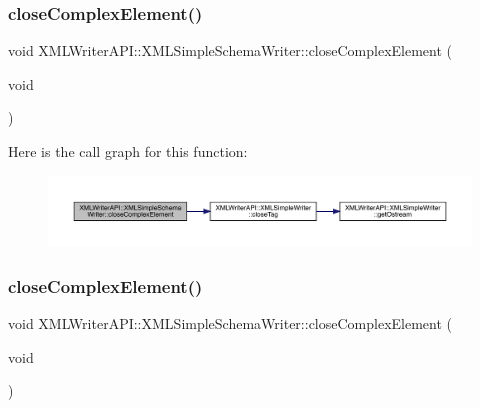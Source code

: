 \subsubsection{\texorpdfstring{closeComplexElement()}{closeComplexElement()}\hspace{0.1cm}{\footnotesize\ttfamily [2/3]}}
{\footnotesize\ttfamily void X\+M\+L\+Writer\+A\+P\+I\+::\+X\+M\+L\+Simple\+Schema\+Writer\+::close\+Complex\+Element (\begin{DoxyParamCaption}\item[{void}]{ }\end{DoxyParamCaption})\hspace{0.3cm}{\ttfamily [inline]}}

Here is the call graph for this function\+:
\nopagebreak
\begin{figure}[H]
\begin{center}
\leavevmode
\includegraphics[width=350pt]{db/d0b/classXMLWriterAPI_1_1XMLSimpleSchemaWriter_a48be6d4cbc08f03e9e76fa94107c4b8a_cgraph}
\end{center}
\end{figure}
\mbox{\label{classXMLWriterAPI_1_1XMLSimpleSchemaWriter_a48be6d4cbc08f03e9e76fa94107c4b8a}} 
\subsubsection{\texorpdfstring{closeComplexElement()}{closeComplexElement()}\hspace{0.1cm}{\footnotesize\ttfamily [3/3]}}
{\footnotesize\ttfamily void X\+M\+L\+Writer\+A\+P\+I\+::\+X\+M\+L\+Simple\+Schema\+Writer\+::close\+Complex\+Element (\begin{DoxyParamCaption}\item[{void}]{ }\end{DoxyParamCaption})\hspace{0.3cm}{\ttfamily [inline]}}

